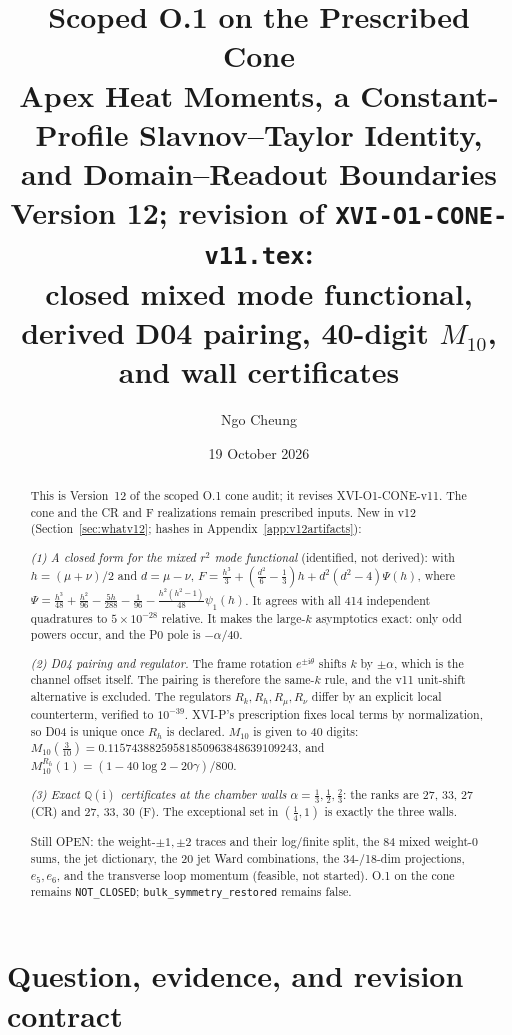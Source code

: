 \documentclass[11pt,a4paper]{article}
\title{\textbf{Scoped O.1 on the Prescribed Cone}\\[5pt]
\Large Apex Heat Moments, a Constant-Profile
Slavnov--Taylor Identity, and Domain--Readout Boundaries\\[5pt]
\large Version 12; revision of \texttt{XVI-O1-CONE-v11.tex}:\\
closed mixed mode functional, derived D04 pairing, 40-digit \(M_{10}\), and wall certificates}
\author{Ngo Cheung}
\date{19 October 2026}
\newcommand{\ii}{\mathrm i}
\newcommand{\OPEN}{\textsf{OPEN}}
\newcommand{\NOTCLOSED}{\texttt{NOT\_CLOSED}}
\theoremstyle{plain}
\theoremstyle{definition}
\theoremstyle{remark}
\numberwithin{equation}{section}
\begin{document}
\maketitle

\begin{abstract}
This is Version~12 of the scoped O.1 cone audit; it revises
XVI-O1-CONE-v11. The cone and the CR and F realizations remain
prescribed inputs. New in v12 (Section~\ref{sec:whatv12}; hashes in
Appendix~\ref{app:v12artifacts}):

\emph{(1) A closed form for the mixed \(r^2\) mode functional}
(identified, not derived): with \(h=(\mu+\nu)/2\) and \(d=\mu-\nu\),
\(F=\tfrac{h^3}3+(\tfrac{d^2}6-\tfrac13)h+d^2(d^2-4)\Psi(h)\), where
\(\Psi=\tfrac{h^3}{48}+\tfrac{h^2}{96}-\tfrac{5h}{288}-\tfrac1{96}-\tfrac{h^2(h^2-1)}{48}\psi_1(h)\).
It agrees with all 414 independent quadratures to
\(5\times10^{-28}\) relative. It makes the large-\(k\) asymptotics
exact: only odd powers occur, and the P0 pole is \(-\alpha/40\).

\emph{(2) D04 pairing and regulator.} The frame rotation
\(e^{\pm\ii\theta}\) shifts \(k\) by \(\pm\alpha\), which is the
channel offset itself. The pairing is therefore the same-\(k\) rule,
and the v11 unit-shift alternative is excluded. The regulators
\(R_k,R_h,R_\mu,R_\nu\) differ by an explicit local counterterm,
verified to \(10^{-39}\). XVI-P's prescription fixes local terms by
normalization, so D04 is unique once \(R_h\) is declared.
\(M_{10}\) is given to 40 digits:
\(M_{10}(\tfrac3{10})=0.11574388259581850963848639109243\), and
\(M_{10}^{R_h}(1)=(1-40\log2-20\gamma)/800\).

\emph{(3) Exact \(\mathbb Q(\ii)\) certificates at the chamber walls}
\(\alpha=\tfrac13,\tfrac12,\tfrac23\): the ranks are 27, 33, 27 (CR)
and 27, 33, 30 (F). The exceptional set in \((\tfrac14,1)\) is
exactly the three walls.

Still \OPEN: the weight-\(\pm1,\pm2\) traces and their log/finite
split, the 84 mixed weight-0 sums, the jet dictionary, the 20 jet
Ward combinations, the 34-/18-dim projections, \(e_5,e_6\), and the
transverse loop momentum (feasible, not started). O.1 on the cone
remains \NOTCLOSED; \texttt{bulk\_symmetry\_restored} remains false.
\end{abstract}

\tableofcontents

\section{Question, evidence, and revision contract}
\label{sec:scope}
\end{document}
